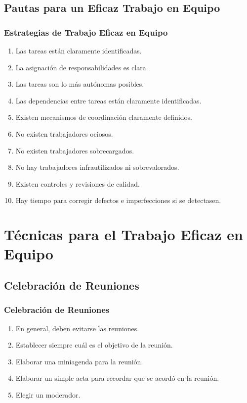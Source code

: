 \documentclass[handout,a4paper,slidestop,xcolor=pst,dvips,blue]{beamer}
\begin{document}
\subsection{Pautas para un Eficaz Trabajo en Equipo}

\begin{frame}[c]
	\frametitle{Estrategias de Trabajo Eficaz en Equipo}
	\begin{enumerate}[<+->]
		\item Las tareas están claramente identificadas.
		\item La asignación de responsabilidades es clara.
		\item Las tareas son lo más autónomas posibles.
		\item Las dependencias entre tareas están claramente identificadas.
		\item Existen mecanismos de coordinación claramente definidos.
		\item No existen trabajadores ociosos.
		\item No existen trabajadores sobrecargados.
		\item No hay trabajadores infrautilizados ni sobrevalorados.
		\item Existen controles y revisiones de calidad.
		\item Hay tiempo para corregir defectos e imperfecciones si se detectasen.
	\end{enumerate}
\end{frame}

\section{Técnicas para el Trabajo Eficaz en Equipo}

\subsection{Celebración de Reuniones}

\begin{frame}[c]
	\frametitle{Celebración de Reuniones}
	\begin{enumerate}[<+->]
		\item En general, deben evitarse las reuniones.
		\item Establecer siempre cuál es el objetivo de la reunión.
		\item Elaborar una miniagenda para la reunión.
		\item Elaborar un simple acta para recordar que se acordó en la reunión.
		\item Elegir un moderador.
	\end{enumerate}
\end{frame}
\end{document}
